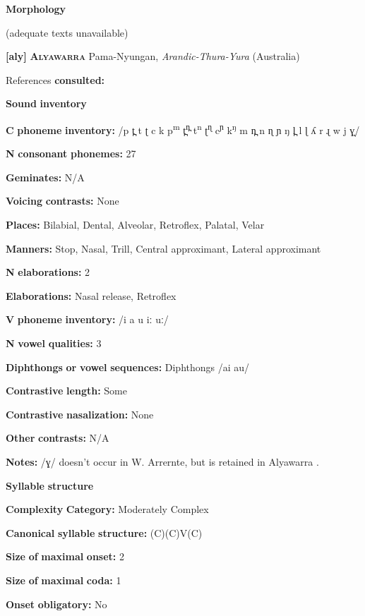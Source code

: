 \begin{styleBody}
\textbf{Morphology}

(adequate texts unavailable)

\textbf{[aly]}   \textbf{\textsc{Alyawarra}}  Pama-Nyungan, \textit{Arandic-Thura-Yura} (Australia)

References \textbf{consulted:} \citet{Yallop1977}

\textbf{Sound} \textbf{inventory}

\textbf{C} \textbf{phoneme} \textbf{inventory:} /p t̪ t ʈ c k p\textsuperscript{m} t̪\textsuperscript{n̪} t\textsuperscript{n} ʈ\textsuperscript{ɳ} c\textsuperscript{ɲ} k\textsuperscript{ŋ} m n̪ n ɳ ɲ ŋ l̪ l ɭ ʎ r ɻ w j ɣ̞/

\textbf{N} \textbf{consonant} \textbf{phonemes:} 27

\textbf{Geminates:} N/A

\textbf{Voicing} \textbf{contrasts:} None

\textbf{Places:} Bilabial, Dental, Alveolar, Retroflex, Palatal, Velar

\textbf{Manners:} Stop, Nasal, Trill, Central approximant, Lateral approximant

\textbf{N} \textbf{elaborations:} 2

\textbf{Elaborations:} Nasal release, Retroflex

\textbf{V} \textbf{phoneme} \textbf{inventory:} /i a u iː uː/

\textbf{N} \textbf{vowel} \textbf{qualities:} 3

\textbf{Diphthongs} \textbf{or} \textbf{vowel} \textbf{sequences:} Diphthongs /ai au/

\textbf{Contrastive} \textbf{length:} Some

\textbf{Contrastive} \textbf{nasalization:} None

\textbf{Other} \textbf{contrasts:} N/A

\textbf{Notes:} /ɣ/ doesn’t occur in W. Arrernte, but is retained in Alyawarra \citep[12]{Yallop1977}.

\textbf{Syllable} \textbf{structure}

\textbf{Complexity} \textbf{Category:} Moderately Complex

\textbf{Canonical} \textbf{syllable} \textbf{structure:} (C)(C)V(C) \citep[41-5]{Yallop1977}

\textbf{Size} \textbf{of} \textbf{maximal} \textbf{onset:} 2

\textbf{Size} \textbf{of} \textbf{maximal} \textbf{coda:} 1

\textbf{Onset} \textbf{obligatory:} No


\end{styleBody}
